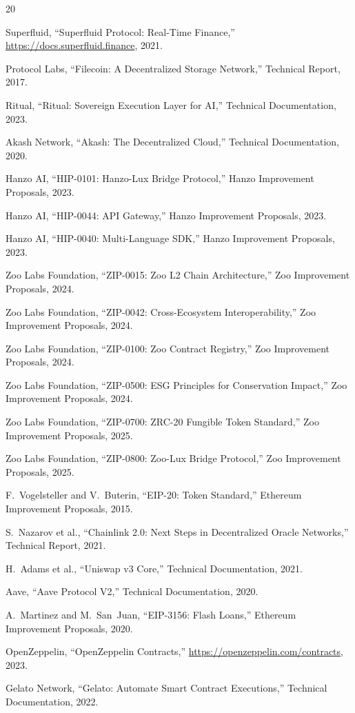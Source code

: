 \documentclass[11pt,letterpaper]{article}
\begin{document}

\begin{thebibliography}{20}

Superfluid, ``Superfluid Protocol: Real-Time Finance,'' \url{https://docs.superfluid.finance}, 2021.

Protocol Labs, ``Filecoin: A Decentralized Storage Network,'' Technical Report, 2017.

Ritual, ``Ritual: Sovereign Execution Layer for AI,'' Technical Documentation, 2023.

Akash Network, ``Akash: The Decentralized Cloud,'' Technical Documentation, 2020.

Hanzo AI, ``HIP-0101: Hanzo-Lux Bridge Protocol,'' Hanzo Improvement Proposals, 2023.

Hanzo AI, ``HIP-0044: API Gateway,'' Hanzo Improvement Proposals, 2023.

Hanzo AI, ``HIP-0040: Multi-Language SDK,'' Hanzo Improvement Proposals, 2023.

Zoo Labs Foundation, ``ZIP-0015: Zoo L2 Chain Architecture,'' Zoo Improvement Proposals, 2024.

Zoo Labs Foundation, ``ZIP-0042: Cross-Ecosystem Interoperability,'' Zoo Improvement Proposals, 2024.

Zoo Labs Foundation, ``ZIP-0100: Zoo Contract Registry,'' Zoo Improvement Proposals, 2024.

Zoo Labs Foundation, ``ZIP-0500: ESG Principles for Conservation Impact,'' Zoo Improvement Proposals, 2024.

Zoo Labs Foundation, ``ZIP-0700: ZRC-20 Fungible Token Standard,'' Zoo Improvement Proposals, 2025.

Zoo Labs Foundation, ``ZIP-0800: Zoo-Lux Bridge Protocol,'' Zoo Improvement Proposals, 2025.

F.~Vogelsteller and V.~Buterin, ``EIP-20: Token Standard,'' Ethereum Improvement Proposals, 2015.

S.~Nazarov et al., ``Chainlink 2.0: Next Steps in Decentralized Oracle Networks,'' Technical Report, 2021.

H.~Adams et al., ``Uniswap v3 Core,'' Technical Documentation, 2021.

Aave, ``Aave Protocol V2,'' Technical Documentation, 2020.

A.~Martinez and M.~San~Juan, ``EIP-3156: Flash Loans,'' Ethereum Improvement Proposals, 2020.

OpenZeppelin, ``OpenZeppelin Contracts,'' \url{https://openzeppelin.com/contracts}, 2023.

Gelato Network, ``Gelato: Automate Smart Contract Executions,'' Technical Documentation, 2022.

\end{thebibliography}
\end{document}
